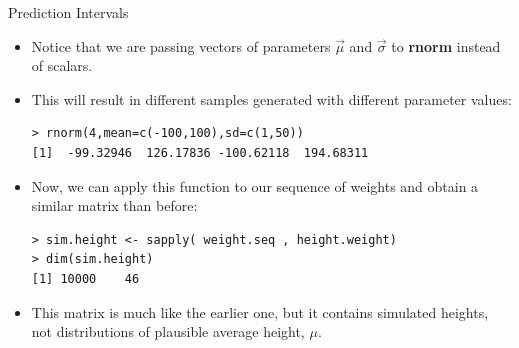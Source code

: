 \documentclass[handout]{beamer}
\begin{document}
\begin{frame}[fragile]{Prediction Intervals}
\scriptsize{
\begin{itemize}


\item Notice that we are passing  vectors of parameters $\vec{\mu}$ and $\vec{\sigma}$ to \textbf{rnorm} instead of scalars.

\item This will result in different samples generated with different parameter values:

\begin{verbatim}
> rnorm(4,mean=c(-100,100),sd=c(1,50))
[1]  -99.32946  126.17836 -100.62118  194.68311
\end{verbatim}

\item Now, we can apply this function to our sequence of weights and obtain a similar matrix  than before:

\begin{verbatim}
> sim.height <- sapply( weight.seq , height.weight)
> dim(sim.height)
[1] 10000    46 
\end{verbatim}

\item This matrix is much like the earlier one, but it contains simulated heights, not distributions of plausible average height, $\mu$.


\end{itemize}
 

 
}
\end{frame}
\end{document}
